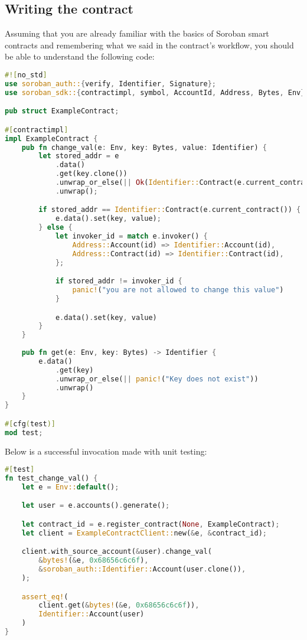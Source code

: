 \subsection{Writing the contract}\label{writing-the-contract}

Assuming that you are already familiar with the basics of Soroban smart contracts and remembering what we said in the contract's workflow, you should be able to understand the following code:

\begin{lstlisting}[breaklines, language=Rust]
#![no_std]
use soroban_auth::{verify, Identifier, Signature};
use soroban_sdk::{contractimpl, symbol, AccountId, Address, Bytes, Env};

pub struct ExampleContract;

#[contractimpl]
impl ExampleContract {
    pub fn change_val(e: Env, key: Bytes, value: Identifier) {
        let stored_addr = e
            .data()
            .get(key.clone())
            .unwrap_or_else(|| Ok(Identifier::Contract(e.current_contract())))
            .unwrap();

        if stored_addr == Identifier::Contract(e.current_contract()) {
            e.data().set(key, value);
        } else {
            let invoker_id = match e.invoker() {
                Address::Account(id) => Identifier::Account(id),
                Address::Contract(id) => Identifier::Contract(id),
            };

            if stored_addr != invoker_id {
                panic!("you are not allowed to change this value")
            }

            e.data().set(key, value)
        }
    }
	
    pub fn get(e: Env, key: Bytes) -> Identifier {
        e.data()
            .get(key)
            .unwrap_or_else(|| panic!("Key does not exist"))
            .unwrap()
    }
}

#[cfg(test)]
mod test;

\end{lstlisting}
   
Below is a successful invocation made with unit testing:

\begin{lstlisting}[breaklines, language=Rust]
#[test]
fn test_change_val() {
    let e = Env::default();

    let user = e.accounts().generate();

    let contract_id = e.register_contract(None, ExampleContract);
    let client = ExampleContractClient::new(&e, &contract_id);

    client.with_source_account(&user).change_val(
        &bytes!(&e, 0x68656c6c6f),
        &soroban_auth::Identifier::Account(user.clone()),
    );

    assert_eq!(
        client.get(&bytes!(&e, 0x68656c6c6f)),
        Identifier::Account(user)
    )
}
\end{lstlisting}
   

